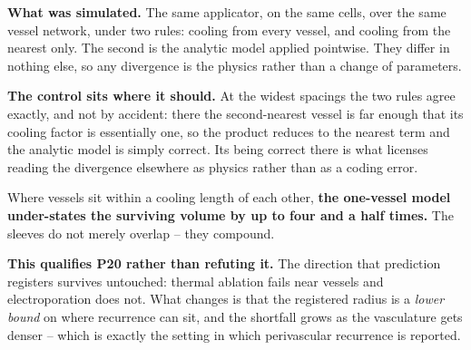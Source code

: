 \documentclass[11pt,twoside,openright]{report}
\begin{document}
\textbf{What was simulated.} The same applicator, on the same cells, over the same vessel network, under two rules: cooling from every vessel, and cooling from the nearest only. The second is the analytic model applied pointwise. They differ in nothing else, so any divergence is the physics rather than a change of parameters.

\begin{numbers}









\end{numbers}

\textbf{The control sits where it should.} At the widest spacings the two rules agree exactly, and not by accident: there the second-nearest vessel is far enough that its cooling factor is essentially one, so the product reduces to the nearest term and the analytic model is simply correct. Its being correct there is what licenses reading the divergence elsewhere as physics rather than as a coding error.

\begin{finding}
Where vessels sit within a cooling length of each other, \textbf{the one-vessel model under-states the surviving volume by up to four and a half times.} The sleeves do not merely overlap -- they compound.

\textbf{This qualifies P20 rather than refuting it.} The direction that prediction registers survives untouched: thermal ablation fails near vessels and electroporation does not. What changes is that the registered radius is a \textit{lower bound} on where recurrence can sit, and the shortfall grows as the vasculature gets denser -- which is exactly the setting in which perivascular recurrence is reported.
\end{finding}
\end{document}
